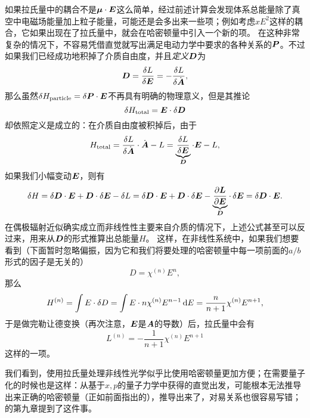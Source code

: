 如果拉氏量中的耦合不是$\vb*{\mu} \cdot \vb*{E}$这么简单，经过前述计算会发现体系总能量除了真空中电磁场能量加上粒子能量，可能还是会多出来一些项；例如考虑$x E^2$这样的耦合，它如果出现在了拉氏量中，就会在哈密顿量中引入一个新的项。
在这种非常复杂的情况下，不容易凭借直觉就写出满足电动力学中要求的各种关系的$\vb*{P}$。不过如果我们已经成功地积掉了介质自由度，并且\emph{定义}$\vb*{D}$为
\begin{equation}
    \vb*{D} = \fdv{L}{\vb*{E}} = - \fdv{L}{\dot{\vb*{A}}},
\end{equation}
那么虽然$\var{H_{\text{particle}}} = \var{\vb*{P}} \cdot \vb*{E}$不再具有明确的物理意义，但是其推论
\begin{equation}
    \var{H_{\text{total}}} = \vb*{E} \cdot \var{\vb*{D}}
\end{equation}
却依照定义是成立的：在介质自由度被积掉后，由于
\begin{equation}
    H_{\text{total}} = \fdv{L}{\dot{\vb*{A}}} \cdot \dot{\vb*{A}} - L 
    = \underbrace{\fdv{L}{\vb*{E}}}_{\vb*{D}} \cdot \vb*{E} - L,
\end{equation}
如果我们小幅变动$\vb*{E}$，则有
\begin{equation}
    \var{H} = \var{\vb*{D}} \cdot \vb*{E} + \vb*{D} \cdot \var{\vb*{E}} - \var{L}
    = \var{\vb*{D}} \cdot \vb*{E} + \vb*{D} \cdot \var{\vb*{E}} - \underbrace{\pdv{\vb*{L}}{\vb*{E}}}_{\vb*{D}} \cdot \var{\vb*{E}}
    = \var{\vb*{D}} \cdot \vb*{E} .
\end{equation}
在偶极辐射近似确实成立而非线性性主要来自介质的情况下，上述公式甚至可以反过来，用来从$\vb*{D}$的形式推算出总能量$H$。
这样，在非线性系统中，如果我们想要看到（下面暂时忽略偏振，因为它和我们将要处理的哈密顿量中每一项前面的$a/b$形式的因子是无关的）
\begin{equation}
    D = \chi^{(n)} E^n,
\end{equation}
那么
\begin{equation}
    H^{(n)} = \int E \cdot \var{D} = 
    \int E \cdot n \chi^{(n)} E^{n-1}  \dd{E}
    = \frac{n}{n+1} \chi^{(n)} E^{n+1},
\end{equation}
于是做完勒让德变换（再次注意，$\vb*{E}$是$\vb*{A}$的导数）后，拉氏量中会有
\begin{equation}
    L^{(n)} = - \frac{1}{n+1} \chi^{(n)} E^{n+1}
    \label{eq:nonlinear-in-lagrangian}
\end{equation}
这样的一项。

我们看到，使用拉氏量处理非线性光学似乎比使用哈密顿量更加方便；在需要量子化的时候也是这样：从基于$x, p$的量子力学中获得的直觉出发，可能根本无法推导出来正确的哈密顿量（正如前面指出的），推导出来了，对易关系也很容易写错；\cite{hillery2009introduction}的第九章提到了这件事。

